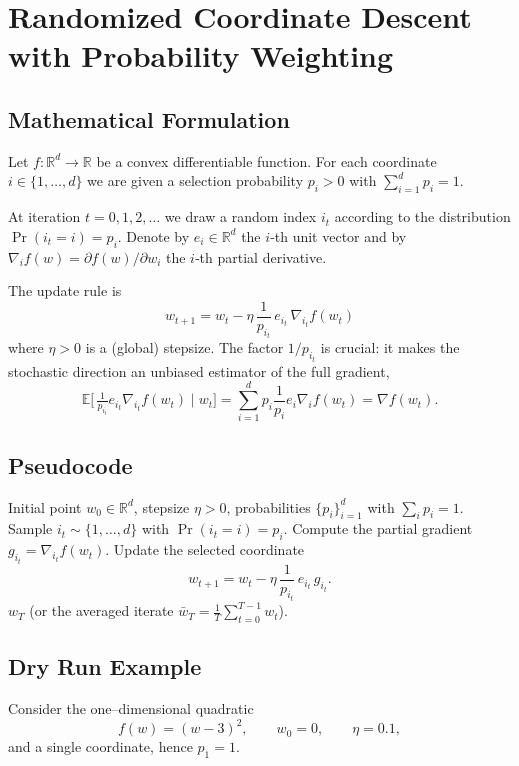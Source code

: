 \documentclass{article}
\newcommand{\E}{\mathbb{E}}
\newcommand{\R}{\mathbb{R}}
\begin{document}
\section*{Randomized Coordinate Descent with Probability Weighting}

\subsection*{Mathematical Formulation}
Let $f:\R^{d}\to\R$ be a convex differentiable function.  
For each coordinate $i\in\{1,\dots ,d\}$ we are given a selection probability 
$p_i>0$ with $\sum_{i=1}^{d}p_i=1$.  

At iteration $t=0,1,2,\dots$ we draw a random index $i_t$ according to the
distribution $\Pr(i_t=i)=p_i$.  
Denote by $e_i\in\R^{d}$ the $i$‑th unit vector and by 
$\nabla_i f(w)=\partial f(w)/\partial w_i$ the $i$‑th partial derivative.  

The update rule is
\[
\boxed{
w_{t+1}=w_{t}-\eta\,\frac{1}{p_{i_t}}\,e_{i_t}\,\nabla_{i_t} f(w_t)
}
\tag{1}
\]
where $\eta>0$ is a (global) stepsize.  
The factor $1/p_{i_t}$ is crucial: it makes the stochastic direction an
unbiased estimator of the full gradient,
\[
\E\!\big[\,\tfrac{1}{p_{i_t}}e_{i_t}\nabla_{i_t} f(w_t)\mid w_t\big]
   =\sum_{i=1}^{d}p_i\frac{1}{p_i}e_i\nabla_i f(w_t)=\nabla f(w_t).
\tag{2}
\]

\subsection*{Pseudocode}
\begin{algorithm}[H]
\caption{Randomized Coordinate Descent (RCD)}\label{alg:RCD}
\begin{algorithmic}[1]
\REQUIRE Initial point $w_0\in\R^{d}$, stepsize $\eta>0$, probabilities $\{p_i\}_{i=1}^{d}$ with $\sum_i p_i=1$.
    \STATE Sample $i_t\sim\{1,\dots,d\}$ with $\Pr(i_t=i)=p_i$.
    \STATE Compute the partial gradient $g_{i_t}= \nabla_{i_t} f(w_t)$.
    \STATE Update the selected coordinate
    \[
        w_{t+1}= w_t - \eta\,\frac{1}{p_{i_t}}\,e_{i_t}\,g_{i_t}.
    \]
\ENDFOR
\RETURN $w_T$ (or the averaged iterate $\bar w_T=\frac1T\sum_{t=0}^{T-1}w_t$).
\end{algorithmic}
\end{algorithm}

\subsection*{Dry Run Example}
Consider the one–dimensional quadratic
\[
f(w)=(w-3)^2,\qquad w_0=0,\qquad \eta=0.1,
\]
and a single coordinate, hence $p_1=1$.  
\end{document}
